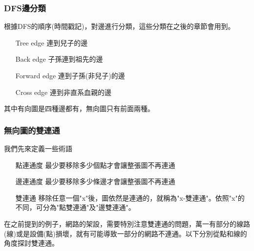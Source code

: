 \subsubsection{DFS邊分類}
根據DFS的順序(時間戳記)，對邊進行分類，這些分類在之後的章節會用到。
\begin{enumerate}
\item [Tree edge] 連到兒子的邊
\item [Back edge] 子孫連到祖先的邊
\item [Forward edge] 連到子孫(非兒子)的邊
\item [Cross edge] 連到非直系血親的邊
\end{enumerate}
其中有向圖是四種邊都有，無向圖只有前面兩種。
\subsubsection{無向圖的雙連通}
我們先來定義一些術語
\begin{enumerate}
\item [點連通度] 最少要移除多少個點才會讓整張圖不再連通
\item [邊連通度] 最少要移除多少條邊才會讓整張圖不再連通
\item [雙連通] 移除任意一個"x"後，圖依然是連通的，就稱為"x-雙連通"。依照"x"的不同，可分為"點雙連通"及"邊雙連通"。
\end{enumerate}
在之前提到的例子，網路的架設，需要特別注意雙連通的問題，萬一有部分的線路(線)或是設備(點)損壞，就有可能導致一部分的網路不連通。以下分別從點和線的角度探討雙連通。
